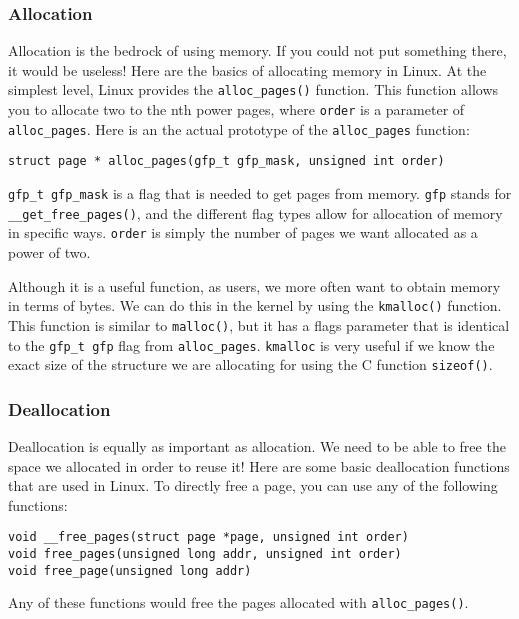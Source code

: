 \documentclass[10pt,letterpaper,onecolumn,draftclsnofoot]{IEEEtran}
\begin{document}
\subsubsection{Allocation}
Allocation is the bedrock of using memory. If you could not put something
there, it would be useless! Here are the basics of allocating memory in
Linux. At the simplest level, Linux provides the \texttt{alloc\_pages()}
function. This function allows you to allocate two to the nth power pages,
where \texttt{order} is a parameter of \texttt{alloc\_pages}. Here is an
the actual prototype of the \texttt{alloc\_pages} function:
\begin{lstlisting}[caption=The alloc\_pages function allows manual allocation of requested pages]
struct page * alloc_pages(gfp_t gfp_mask, unsigned int order)
\end{lstlisting}
\texttt{gfp\_t gfp\_mask} is a flag that is needed to get pages from memory.
\texttt{gfp} stands for \texttt{\_\_get\_free\_pages()}, and the different
flag types allow for allocation of memory in specific ways.\cite{robertlove2010}
\texttt{order} is simply the number of pages we want allocated as a power
of two.

Although it is a useful function, as users, we more often want to obtain
memory in terms of bytes. We can do this in the kernel by using the
\texttt{kmalloc()} function. This function is similar to \texttt{malloc()},
but it has a flags parameter that is identical to the \texttt{gfp\_t gfp}
flag from \texttt{alloc\_pages}. \texttt{kmalloc} is very useful if we
know the exact size of the structure we are allocating for using the C
function \texttt{sizeof()}.

\subsubsection{Deallocation}
Deallocation is equally as important as allocation. We need to be able
to free the space we allocated in order to reuse it! Here are some basic
deallocation functions that are used in Linux. To directly free a page,
you can use any of the following functions:
\begin{lstlisting}[caption=Void pointers to the free pages functions]
void __free_pages(struct page *page, unsigned int order)
void free_pages(unsigned long addr, unsigned int order)
void free_page(unsigned long addr)
\end{lstlisting}
Any of these functions would free the pages allocated with \texttt{alloc\_pages()}.
\end{document}
